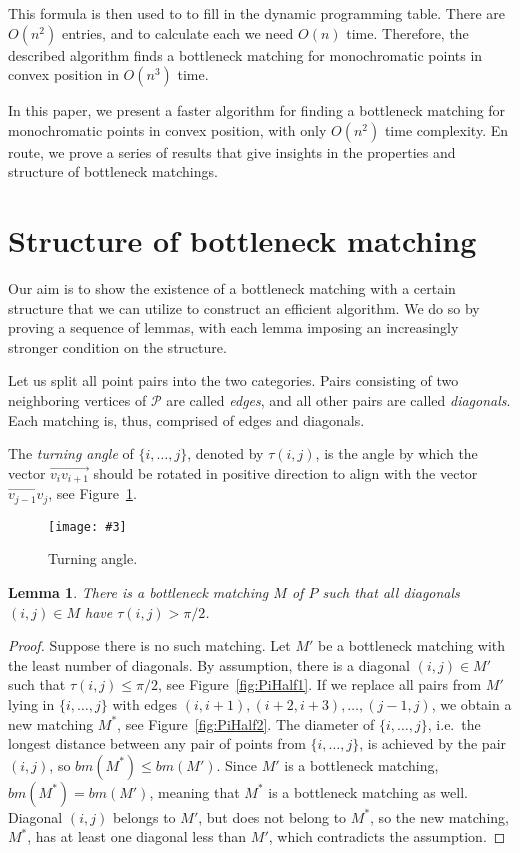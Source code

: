 \documentclass[a4paper, 11pt]{article}
\newtheorem{lemma}[theorem]{Lemma}
\newcommand{\fig}[3]{
	\begin{figure}[ht]
		\centering
		\texttt{[image: \#3]}
		\caption{#2}
		\label{#1}
	\end{figure}
}
\newcommand{\p}[2]{\{#1, \ldots, #2\}}
\newcommand{\pij}{\p{i}{j}}
\begin{document}
This formula is then used to to fill in the dynamic programming table. There are $O(n^2)$ entries, and to calculate each we need $O(n)$ time. Therefore, the described algorithm finds a bottleneck matching for monochromatic points in convex position in $O(n^3)$ time.

In this paper, we present a faster algorithm for finding a bottleneck matching for monochromatic points in convex position, with only $O(n^2)$ time complexity. En route, we prove a series of results that give insights in the properties and structure of bottleneck matchings.


\section{Structure of bottleneck matching}

Our aim is to show the existence of a bottleneck matching with a certain structure that we can utilize to construct an efficient algorithm. We do so by proving a sequence of lemmas, with each lemma imposing an increasingly stronger condition on the structure.

Let us split all point pairs into the two categories. Pairs consisting of two neighboring vertices of $\mathcal{P}$ are called \emph{edges}, and all other pairs are called \emph{diagonals}. Each matching is, thus, comprised of edges and diagonals.

The \emph{turning angle} of $\pij$, denoted by $\tau(i,j)$, is the angle by which the vector $\overrightarrow{v_iv_{i+1}}$ should be rotated in positive direction to align with the vector $\overrightarrow{v_{j-1}v_j}$, see Figure~\ref{fig:TurningAngle}.

\fig{fig:TurningAngle}{Turning angle.}{TurningAngle.pdf}


\begin{lemma}
	\label{lem:PiHalf}
	There is a bottleneck matching $M$ of $P$ such that all diagonals $(i,j) \in M$ have $\tau(i,j) > \pi/2$.
\end{lemma}
\begin{proof}
	Suppose there is no such matching. Let $M'$ be a bottleneck matching with the least number of diagonals. By assumption, there is a diagonal $(i,j) \in M'$ such that $\tau(i,j) \leq \pi/2$, see Figure~\ref{fig:PiHalf1}. If we replace all pairs from $M'$ lying in $\pij$ with edges $(i,i+1), (i+2,i+3), \ldots, (j-1,j)$, we obtain a new matching $M^*$, see Figure~\ref{fig:PiHalf2}. The diameter of $\pij$, i.e.\ the longest distance between any pair of points from $\pij$, is achieved by the pair $(i,j)$, so $bm(M^*) \leq bm(M')$. Since $M'$ is a bottleneck matching, $bm(M^*) = bm(M')$, meaning that $M^*$ is a bottleneck matching as well. Diagonal $(i,j)$ belongs to $M'$, but does not belong to $M^*$, so the new matching, $M^*$, has at least one diagonal less than $M'$, which contradicts the assumption.
\end{proof}
\end{document}
